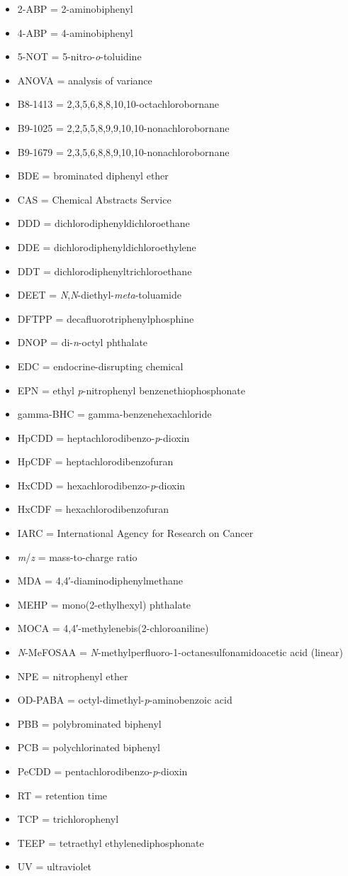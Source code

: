 \begin{itemize}
\setlength{\itemsep}{2pt}
\setlength{\parskip}{0pt}
\setlength{\parsep}{0pt}
  \item 2-ABP = 2-aminobiphenyl
  \item 4-ABP = 4-aminobiphenyl
  \item 5-NOT = 5-nitro-\textit{o}-toluidine
  \item ANOVA = analysis of variance
  \item B8-1413 = 2,3,5,6,8,8,10,10-octachlorobornane
  \item B9-1025 = 2,2,5,5,8,9,9,10,10-nonachlorobornane
  \item B9-1679 = 2,3,5,6,8,8,9,10,10-nonachlorobornane
  \item BDE = brominated diphenyl ether
  \item CAS = Chemical Abstracts Service
  \item DDD = dichlorodiphenyldichloroethane
  \item DDE = dichlorodiphenyldichloroethylene
  \item DDT = dichlorodiphenyltrichloroethane
  \item DEET = \textit{N},\textit{N}-diethyl-\textit{meta}-toluamide
  \item DFTPP = decafluorotriphenylphosphine
  \item DNOP = di-\textit{n}-octyl phthalate
  \item EDC = endocrine-disrupting chemical
  \item EPN = ethyl \textit{p}-nitrophenyl benzenethiophosphonate
  \item gamma-BHC = gamma-benzenehexachloride
  \item HpCDD = heptachlorodibenzo-\textit{p}-dioxin
  \item HpCDF = heptachlorodibenzofuran
  \item HxCDD = hexachlorodibenzo-\textit{p}-dioxin
  \item HxCDF = hexachlorodibenzofuran
  \item IARC = International Agency for Research on Cancer
  \item \textit{m}/\textit{z} = mass-to-charge ratio
  \item MDA = 4,4′-diaminodiphenylmethane
  \item MEHP = mono(2-ethylhexyl) phthalate
  \item MOCA = 4,4′-methylenebis(2-chloroaniline)
  \item \textit{N}-MeFOSAA = \textit{N}-methylperfluoro-1-octanesulfonamidoacetic acid (linear)
  \item NPE = nitrophenyl ether
  \item OD-PABA = octyl-dimethyl-\textit{p}-aminobenzoic acid
  \item PBB = polybrominated biphenyl
  \item PCB = polychlorinated biphenyl
  \item PeCDD = pentachlorodibenzo-\textit{p}-dioxin
  \item RT = retention time
  \item TCP = trichlorophenyl
  \item TEEP = tetraethyl ethylenediphosphonate
  \item UV = ultraviolet
\end{itemize}
